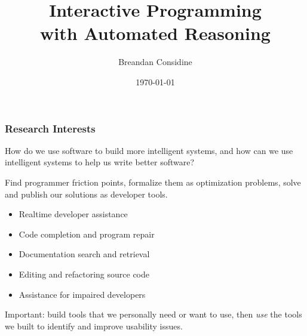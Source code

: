 \documentclass[mathserif,notheorems]{beamer}
\title{Interactive Programming\\ with Automated Reasoning}
\author{Breandan Considine}
\institute[McGill]{
  McGill University \\
  \medskip
  \textit{breandan.considine@mail.mcgill.ca}
}
\date{\today}
\theoremstyle{plain} %
\theoremstyle{definition} %
\begin{document}
\begin{frame}
  \titlepage
\end{frame}


\begin{frame}
  \frametitle{Research Interests}
  How do we use software to build more intelligent systems, and how can we use intelligent systems to help us write better software?\vspace{10pt}

  Find programmer friction points, formalize them as optimization problems, solve and publish our solutions as developer tools.

  \vspace{10pt}
  \begin{itemize}
    \item Realtime developer assistance
    \item Code completion and program repair
    \item Documentation search and retrieval
    \item Editing and refactoring source code
    \item Assistance for impaired developers
  \end{itemize}
  \vspace{10pt}

  Important: build tools that we personally need or want to use, then \textit{use} the tools we built to identify and improve usability issues.
\end{frame}
\end{document}
